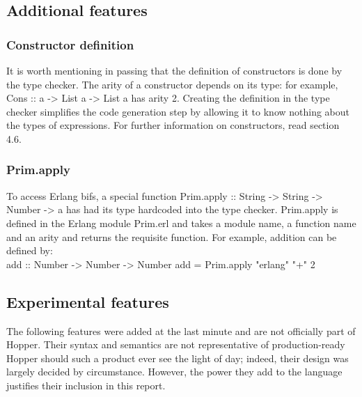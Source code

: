\subsection{Additional features}
\subsubsection{Constructor definition}
It is worth mentioning in passing that the definition of constructors is done by the type checker. The arity of a constructor depends on its type: for example, Cons :: a -> List a -> List a has arity 2. Creating the definition in the type checker simplifies the code generation step by allowing it to know nothing about the types of expressions. For further information on constructors, read section 4.6.
\subsubsection{Prim.apply}
To access Erlang bifs, a special function Prim.apply :: String -> String -> Number -> a has had its type hardcoded into the type checker. Prim.apply is defined in the Erlang module Prim.erl and takes a module name, a function name and an arity and returns the requisite function. For example, addition can be defined by: \\
add :: Number -> Number -> Number
add = Prim.apply "erlang" "+" 2 

\subsection{Experimental features}

The following features were added at the last minute and are not officially part of Hopper. Their syntax and semantics are not representative of production-ready Hopper should such a product ever see the light of day; indeed, their design was largely decided by circumstance. However, the power they add to the language justifies their inclusion in this report.
